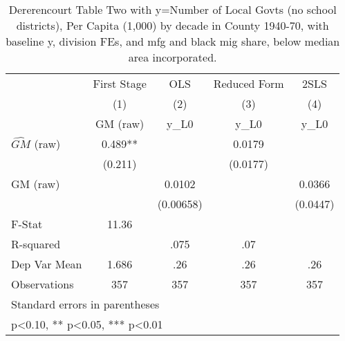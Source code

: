 \begin{table}[htbp]\centering
\def\sym#1{\ifmmode^{#1}\else\(^{#1}\)\fi}
\caption{Dererencourt Table Two with y=Number of Local Govts (no school districts), Per Capita (1,000) by decade in County 1940-70, with baseline y, division FEs, and mfg and black mig share, below median area incorporated.}
\begin{tabular}{l*{4}{c}}
\toprule
                    & First Stage   &         OLS   &Reduced Form   &        2SLS   \\
                    &\multicolumn{1}{c}{(1)}&\multicolumn{1}{c}{(2)}&\multicolumn{1}{c}{(3)}&\multicolumn{1}{c}{(4)}\\
                    &\multicolumn{1}{c}{GM  (raw)}&\multicolumn{1}{c}{y\_L0}&\multicolumn{1}{c}{y\_L0}&\multicolumn{1}{c}{y\_L0}\\
\midrule
$\hat{GM}$ (raw)    &       0.489** &               &      0.0179   &               \\
                    &     (0.211)   &               &    (0.0177)   &               \\
\addlinespace
GM  (raw)           &               &      0.0102   &               &      0.0366   \\
                    &               &   (0.00658)   &               &    (0.0447)   \\
\midrule
F-Stat              &       11.36   &               &               &               \\
R-squared           &               &        .075   &         .07   &               \\
Dep Var Mean        &       1.686   &         .26   &         .26   &         .26   \\
Observations        &         357   &         357   &         357   &         357   \\
\bottomrule
\multicolumn{5}{l}{\footnotesize Standard errors in parentheses}\\
\multicolumn{5}{l}{\footnotesize * p<0.10, ** p<0.05, *** p<0.01}\\
\end{tabular}
\end{table}
